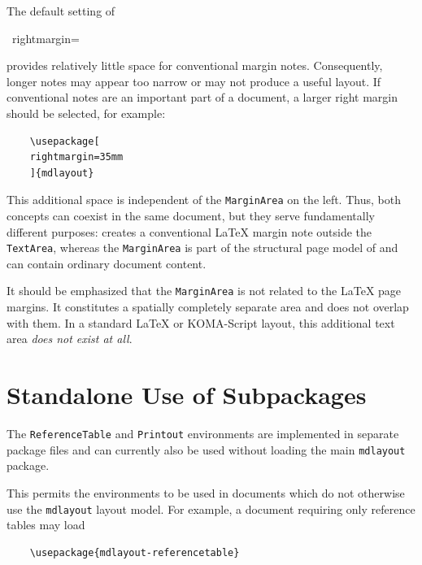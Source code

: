 \documentclass[
11pt,
a4paper,
oneside
]{scrbook}
\begin{document}
{\noindent The default \mdlayout{} setting of
\begin{typewriter}
\	rightmargin=\mdDefaultRightmargin
\end{typewriter}
provides relatively little space for conventional margin notes.
Consequently, longer notes may appear too narrow or may not produce
a useful layout. If conventional \texttt{\string\marginpar} notes are
an important part of a document, a larger right margin should be
selected, for example:
\begin{verbatim}
	\usepackage[
	rightmargin=35mm
	]{mdlayout}
\end{verbatim}
This additional space is independent of the \mdlayout{}
\texttt{MarginArea} on the left.
Thus, both concepts can coexist in the same document, but they serve
fundamentally different purposes: \texttt{\string\marginpar} creates
a conventional \LaTeX{} margin note outside the \texttt{TextArea},
whereas the \texttt{MarginArea} is part of the structural page model
of \mdlayout{} and can contain ordinary document content.

\begin{note}
	It should be emphasized that the \texttt{MarginArea} is not related to the
	\LaTeX{} page margins. It constitutes a spatially completely separate area
	and does not overlap with them. In a standard \LaTeX{} or KOMA-Script layout,
	this additional text area \emph{does not exist at all}.
\end{note}

\section{Standalone Use of Subpackages}
\label{sec:StandaloneSubpackages}

The \texttt{ReferenceTable} and \texttt{Printout} environments are implemented
in separate package files and can currently also be used without loading the
main \texttt{mdlayout} package.

This permits the environments to be used in documents which do not otherwise
use the \texttt{mdlayout} layout model. For example, a document requiring only
reference tables may load

\begin{verbatim}
	\usepackage{mdlayout-referencetable}
\end{verbatim}

}
\end{document}
